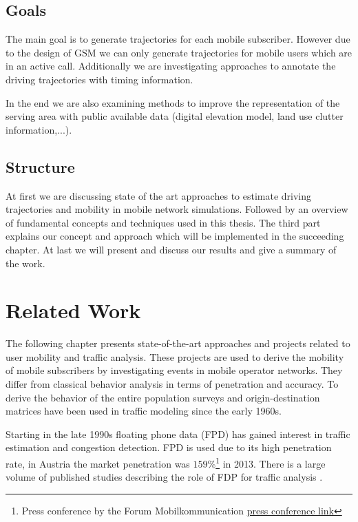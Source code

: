 \documentclass[master,english]{hgbthesis}
\begin{document}
\section{Goals}

The main goal is to generate trajectories for each mobile subscriber. However due to the design of GSM we can only generate trajectories for mobile users which are in an active call. Additionally we are investigating approaches to annotate the driving trajectories with timing information.

In the end we are also examining methods to improve the representation of the serving area with public available data (digital elevation model, land use clutter information,...).

\section{Structure}

At first we are discussing state of the art approaches to estimate driving trajectories and mobility in mobile network simulations. Followed by an overview of fundamental concepts and techniques used in this thesis. The third part explains our concept and approach which will be implemented in the succeeding chapter. At last we will present and discuss our results and give a summary of the work.%



\chapter{Related Work}

The following chapter presents state-of-the-art approaches and projects related to user mobility and traffic analysis. These projects are used to derive the mobility of mobile subscribers by investigating events in mobile operator networks. They differ from classical behavior analysis in terms of penetration and accuracy. To derive the behavior of the entire population surveys and origin-destination matrices have been used in traffic modeling since the early 1960s.

Starting in the late 1990s floating phone data (FPD) has gained interest in traffic estimation and congestion detection. FPD is used due to its high penetration rate, in Austria the market penetration was $159\%$\footnote{Press conference by the Forum Mobilkommunication \href{http://www.fmk.at/Medien/Pressekonferenzen/FMK-Jahrespressekonferenz-2012}{press conference link}} in 2013. There is a large volume of published studies describing the role of FDP for traffic analysis \cite{Yim2001,Qiu2007,Caceres2008}.
\end{document}
